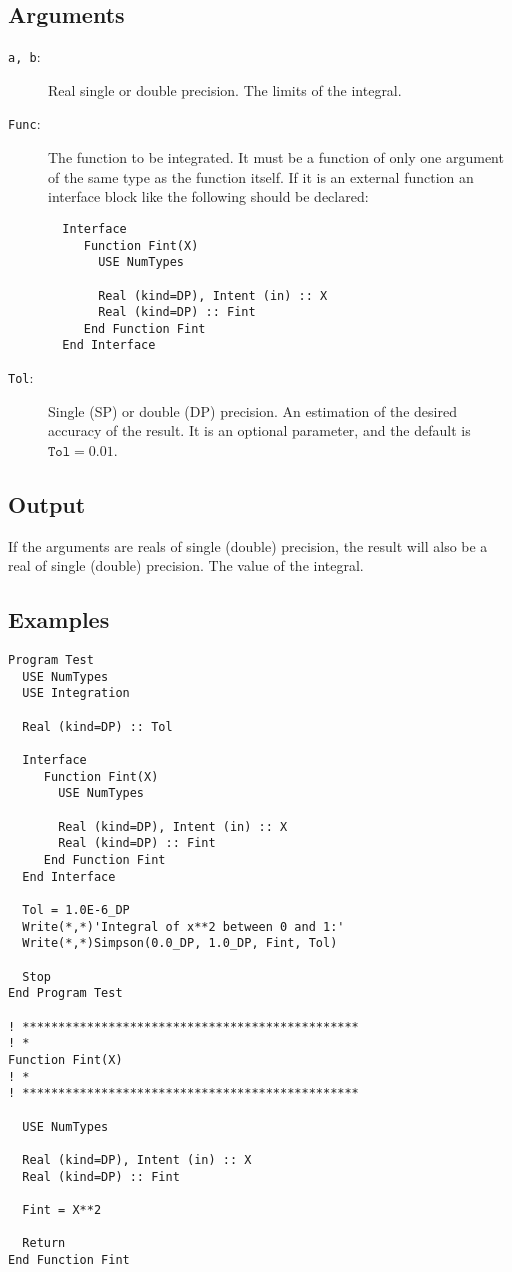 \subsection{Arguments}

\begin{description}
\item[\texttt{a, b}:] Real single or double precision. The limits of
  the integral. 
\item[\texttt{Func}:] The function to be integrated. It must be a
  function of only one argument of the same type as the function
  itself. If it is an
  external function an interface block like the following should be
  declared: 
\begin{verbatim}
  Interface 
     Function Fint(X)
       USE NumTypes

       Real (kind=DP), Intent (in) :: X
       Real (kind=DP) :: Fint
     End Function Fint
  End Interface
\end{verbatim}
\item[\texttt{Tol}:] Single (SP) or double (DP) precision. An
  estimation of the desired accuracy of the result. It is an optional
  parameter, and the default is $\mathtt{Tol} = 0.01$. 
\end{description}


\subsection{Output}

If the arguments are reals of single (double) precision, the result
will also be a real of single (double) precision. The value of the
integral. 


\subsection{Examples}

\begin{lstlisting}[emph=Simpson,
                   emphstyle=\color{blue},
                   frame=trBL,
                   caption=Exmaple of integration of a function using \texttt{Simpson}.,
                   label=simpson]
Program Test
  USE NumTypes
  USE Integration

  Real (kind=DP) :: Tol

  Interface 
     Function Fint(X)
       USE NumTypes

       Real (kind=DP), Intent (in) :: X
       Real (kind=DP) :: Fint
     End Function Fint
  End Interface

  Tol = 1.0E-6_DP
  Write(*,*)'Integral of x**2 between 0 and 1:'
  Write(*,*)Simpson(0.0_DP, 1.0_DP, Fint, Tol)

  Stop
End Program Test

! ***********************************************
! *
Function Fint(X)
! *  
! ***********************************************

  USE NumTypes

  Real (kind=DP), Intent (in) :: X
  Real (kind=DP) :: Fint

  Fint = X**2

  Return
End Function Fint
\end{lstlisting}


